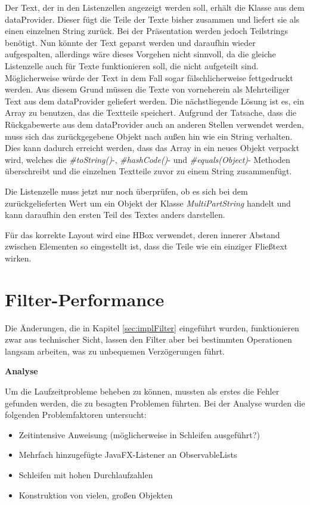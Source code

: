 Der Text, der in den Listenzellen angezeigt werden soll, erhält die Klasse aus dem \gls{dataProvider}. Dieser fügt die Teile der Texte bisher zusammen und liefert sie als einen einzelnen String zurück. Bei der Präsentation werden jedoch Teilstrings benötigt. Nun könnte der Text geparst werden und daraufhin wieder aufgespalten, allerdings wäre dieses Vorgehen nicht sinnvoll, da die gleiche Listenzelle auch für Texte funktionieren soll, die nicht aufgeteilt sind. Möglicherweise würde der Text in dem Fall sogar fälschlicherweise fettgedruckt werden. Aus diesem Grund müssen die Texte von vorneherein als Mehrteiliger Text aus dem \gls{dataProvider} geliefert werden. Die nächstliegende Lösung ist es, ein Array zu benutzen, das die Textteile speichert. Aufgrund der Tatsache, dass die Rückgabewerte aus dem \gls{dataProvider} auch an anderen Stellen verwendet werden, muss sich das zurückgegebene Objekt nach außen hin wie ein String verhalten. Dies kann dadurch erreicht werden, dass das Array in ein neues Objekt verpackt wird, welches die \textit{\#toString()}-, \textit{\#hashCode()}- und \textit{\#equals(Object)}- Methoden überschreibt und die einzelnen Textteile zuvor zu einem String zusammenfügt.

Die Listenzelle muss jetzt nur noch überprüfen, ob es sich bei dem zurückgelieferten Wert um ein Objekt der Klasse \textit{MultiPartString} handelt und kann daraufhin den ersten Teil des Textes anders darstellen.

Für das korrekte Layout wird eine HBox verwendet, deren innerer Abstand zwischen Elementen so eingestellt ist, dass die Teile wie ein einziger Fließtext wirken.
\section{Filter-Performance} \label{sec:analyseFilterPerformance}
Die Änderungen, die in Kapitel \ref{sec:implFilter} eingeführt wurden, funktionieren zwar aus technischer Sicht, lassen den Filter aber bei bestimmten Operationen langsam arbeiten, was zu unbequemen Verzögerungen führt.

\textbf{Analyse}

Um die Laufzeitprobleme beheben zu können, mussten als erstes die Fehler gefunden werden, die zu besagten Problemen führten. Bei der Analyse wurden die folgenden Problemfaktoren untersucht:

\begin{itemize}
	\item Zeitintensive Anweisung (möglicherweise in Schleifen ausgeführt?)
	\item Mehrfach hinzugefügte JavaFX-Listener an ObservableLists
	\item Schleifen mit hohen Durchlaufzahlen
	\item Konstruktion von vielen, großen Objekten
\end{itemize}

